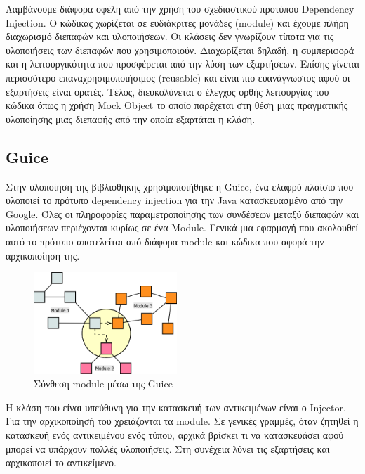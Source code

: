 Λαμβάνουμε διάφορα οφέλη από την χρήση του σχεδιαστικού προτύπου 
Dependency Injection. Ο κώδικας χωρίζεται σε ευδιάκριτες μονάδες 
(module) και έχουμε πλήρη διαχωρισμό διεπαφών και υλοποιήσεων. Οι 
κλάσεις δεν γνωρίζουν τίποτα για τις υλοποιήσεις των διεπαφών που 
χρησιμοποιούν. Διαχωρίζεται δηλαδή, η συμπεριφορά και η λειτουργικότητα 
που προσφέρεται από την λύση των εξαρτήσεων. Επίσης γίνεται περισσότερο 
επαναχρησιμοποιήσιμος (reusable) και είναι πιο ευανάγνωστος αφού οι 
εξαρτήσεις είναι ορατές. Τέλος, διευκολύνεται ο έλεγχος ορθής 
λειτουργίας του κώδικα όπως η χρήση Mock Object \citep{Freeman04mockroles} 
το οποίο παρέχεται στη θέση μιας πραγματικής υλοποίησης μιας διεπαφής από την 
οποία εξαρτάται η κλάση.

\subsection{Guice}

Στην υλοποίηση της βιβλιοθήκης χρησιμοποιήθηκε η Guice, ένα ελαφρύ 
πλαίσιο που υλοποιεί το πρότυπο dependency injection για την Java 
κατασκευασμένο από την Google. Όλες οι πληροφορίες παραμετροποίησης των 
συνδέσεων μεταξύ διεπαφών και υλοποιήσεων περιέχονται κυρίως σε ένα 
Module. Γενικά μια εφαρμογή που ακολουθεί αυτό το πρότυπο αποτελείται 
από διάφορα module και κώδικα που αφορά την αρχικοποίηση της.

\begin{figure}
  \begin{center}
    \includegraphics[width=0.48\textwidth]{Figures/Guice_modules.png}
  \end{center}
  \caption{Σύνθεση module μέσω της Guice}
  \label{fig:Guice}
\end{figure}

Η κλάση που είναι υπεύθυνη για την κατασκευή των αντικειμένων είναι ο 
Injector. Για την αρχικοποίησή του χρειάζονται τα module. Σε γενικές 
γραμμές, όταν ζητηθεί η κατασκευή ενός αντικειμένου ενός τύπου, αρχικά 
βρίσκει τι να κατασκευάσει αφού μπορεί να υπάρχουν πολλές υλοποιήσεις. 
Στη συνέχεια λύνει τις εξαρτήσεις και αρχικοποιεί το αντικείμενο.

